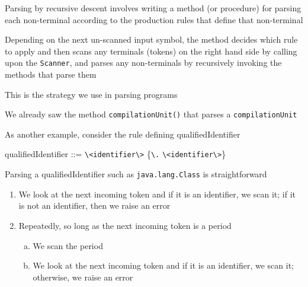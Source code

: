 \documentclass[8pt,a4paper,compress,handout]{beamer}
\newenvironment{spaced}
{
\smallskip
\hspace{.5cm}
\begin{minipage}[c]{\textwidth}
}
{
\end{minipage}
\smallskip
}
\begin{document}
\begin{frame}[fragile]
\pause

Parsing by recursive descent involves writing a method (or procedure) for parsing each non-terminal according to the production rules that define that non-terminal

\pause
\bigskip

Depending on the next un-scanned input symbol, the method decides which rule to apply and then scans any terminals (tokens) on the right hand side by calling upon the \lstinline{Scanner}, and parses any non-terminals by recursively invoking the methods that parse them

\pause
\bigskip

This is the strategy we use in parsing \jmm programs

\pause
\bigskip

We already saw the method \lstinline{compilationUnit()} that parses a \jmm \lstinline{compilationUnit}

\pause
\bigskip

As another example, consider the rule defining qualifiedIdentifier

\text{ }
\begin{spaced}
\begin{production}
qualifiedIdentifier ::= \lstinline{\<identifier\>} \{\lstinline{\.} \lstinline{\<identifier\>}\}
\end{production}
\end{spaced}

\pause

Parsing a qualifiedIdentifier such as \lstinline{java.lang.Class} is straightforward
\begin{enumerate}
\item We look at the next incoming token and if it is an identifier, we scan it; if it is not an identifier, then we raise an error
\item Repeatedly, so long as the next incoming token is a period
\begin{enumerate}[a.]
\item We scan the period
\item We look at the next incoming token and if it is an identifier, we scan it; otherwise, we raise an error
\end{enumerate}
\end{enumerate}
\end{frame}
\end{document}
